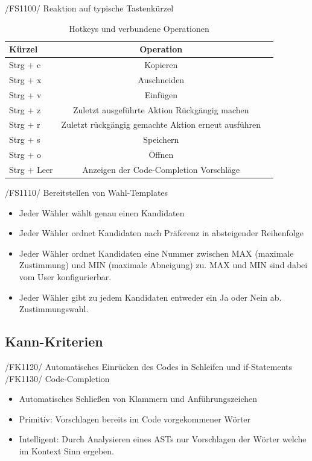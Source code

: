 \documentclass[a4paper]{scrreprt}
\begin{document}
/FS1100/ Reaktion auf typische Tastenkürzel\\
\begin{table}[H]
\caption{Hotkeys und verbundene Operationen}
\begin{tabular}{lcr} 
Kürzel & Operation \\
\hline 
Strg + c & Kopieren \\
Strg + x & Auschneiden \\
Strg + v & Einfügen \\
Strg + z & Zuletzt ausgeführte Aktion Rückgängig machen \\
Strg + r & Zuletzt rückgängig gemachte Aktion erneut ausführen \\
Strg + s & Speichern \\
Strg + o & Öffnen \\
Strg + Leer & Anzeigen der Code-Completion Vorschläge\\
\end{tabular}
\label{table:Hotkeys_and_operations}
\end{table}

/FS1110/ Bereitstellen von Wahl-Templates
\begin{itemize}
\item Jeder Wähler wählt genau einen Kandidaten
\item Jeder Wähler ordnet Kandidaten nach Präferenz in absteigender Reihenfolge 
\item Jeder Wähler ordnet Kandidaten eine Nummer zwischen MAX (maximale Zustimmung) und MIN (maximale Abneigung) zu. MAX und MIN sind dabei vom User konfigurierbar. 
\item Jeder Wähler gibt zu jedem Kandidaten entweder ein Ja oder Nein ab. Zustimmungswahl.
\end{itemize}

\subsection{Kann-Kriterien}
/FK1120/ Automatisches Einrücken des Codes in Schleifen und if-Statements \\
/FK1130/ Code-Completion
\begin{itemize}
\item Automatisches Schließen von Klammern und Anführungszeichen
\item Primitiv: Vorschlagen bereits im Code vorgekommener Wörter
\item Intelligent: Durch Analysieren eines ASTs nur Vorschlagen der Wörter welche im Kontext Sinn ergeben.
\end{itemize}
\end{document}
